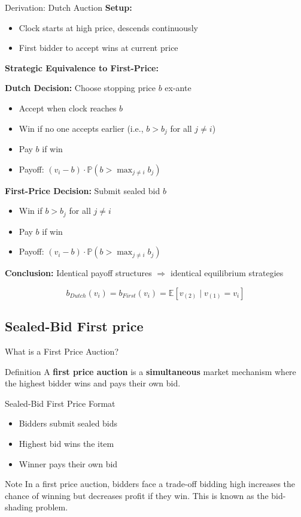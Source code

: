 \documentclass[xcolor={x11names}]{beamer}
\begin{document}
\begin{frame}{Derivation: Dutch Auction}
\textbf{Setup:}
\begin{itemize}
  \item Clock starts at high price, descends continuously
  \item First bidder to accept wins at current price
\end{itemize}

\textbf{Strategic Equivalence to First-Price:}

\textbf{Dutch Decision:} Choose stopping price $b$ ex-ante
\begin{itemize}
  \item Accept when clock reaches $b$
  \item Win if no one accepts earlier (i.e., $b > b_j$ for all $j \neq i$)
  \item Pay $b$ if win
  \item Payoff: $(v_i - b) \cdot \mathbb{P}(b > \max_{j \neq i} b_j)$
\end{itemize}

\textbf{First-Price Decision:} Submit sealed bid $b$
\begin{itemize}
  \item Win if $b > b_j$ for all $j \neq i$
  \item Pay $b$ if win
  \item Payoff: $(v_i - b) \cdot \mathbb{P}(b > \max_{j \neq i} b_j)$
\end{itemize}

\textbf{Conclusion:} Identical payoff structures $\Rightarrow$ identical equilibrium strategies

$$b_{Dutch}(v_i) = b_{First}(v_i) = \mathbb{E}[v_{(2)} \mid v_{(1)} = v_i]$$
\end{frame}

\subsection{Sealed-Bid First price}

\begin{frame}{What is a First Price Auction?}
\begin{block}{Definition}
A \textbf{first price auction} is a \textbf{simultaneous} market mechanism where the highest bidder wins and pays their own bid. 
\end{block}

\begin{exampleblock}{Sealed-Bid First Price Format}
\begin{itemize}
\item Bidders submit sealed bids
\item Highest bid wins the item
\item Winner pays their own bid
\end{itemize}
\end{exampleblock}

\begin{alertblock}{Note}
In a first price auction, bidders face a trade-off bidding high increases the chance of winning but decreases profit if they win. This is known as the bid-shading problem.
\end{alertblock}
\end{frame}
\end{document}
